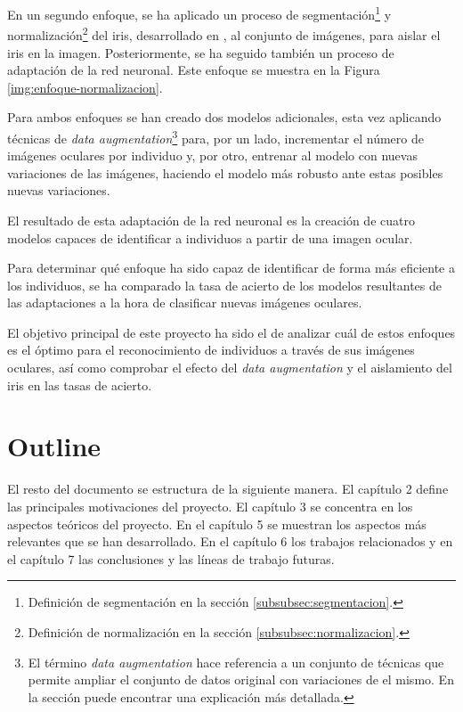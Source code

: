 

En un segundo enfoque, se ha aplicado un proceso de segmentación\footnote{Definición de segmentación en la sección \ref{subsubsec:segmentacion}.} y normalización\footnote{Definición de normalización en la sección \ref{subsubsec:normalizacion}.} del iris, desarrollado en \cite{tfg_iris_2020}, al conjunto de imágenes, para aislar el iris en la imagen. Posteriormente, se ha seguido también un proceso de adaptación de la red neuronal. Este enfoque se muestra en la Figura \ref{img:enfoque-normalizacion}.



Para ambos enfoques se han creado dos modelos adicionales, esta vez aplicando técnicas de \textit{data augmentation}\footnote{El término \textit{data augmentation} hace referencia a un conjunto de técnicas que permite ampliar el conjunto de datos original con variaciones de el mismo. En la sección  puede encontrar una explicación más detallada.} para, por un lado, incrementar el número de imágenes oculares por individuo y, por otro, entrenar al modelo con nuevas variaciones de las imágenes, haciendo el modelo más robusto ante estas posibles nuevas variaciones.

El resultado de esta adaptación de la red neuronal es la creación de cuatro modelos capaces de identificar a individuos a partir de una imagen ocular. 

Para determinar qué enfoque ha sido capaz de identificar de forma más eficiente a los individuos, se ha comparado la tasa de acierto de los modelos resultantes de las adaptaciones a la hora de clasificar nuevas imágenes oculares. 

El objetivo principal de este proyecto ha sido el de analizar cuál de estos enfoques es el óptimo para el reconocimiento de individuos a través de sus imágenes oculares, así como comprobar el efecto del \textit{data augmentation } y el aislamiento del iris en las tasas de acierto.

\section{Outline}

El resto del documento se estructura de la siguiente manera. El capítulo 2  define las principales motivaciones del proyecto. El capítulo 3  se concentra en los aspectos teóricos del proyecto. En el capítulo 5  se muestran los aspectos
más relevantes que se han desarrollado. En el capítulo 6  los trabajos relacionados y en el capítulo 7  las conclusiones y las líneas de trabajo futuras.

